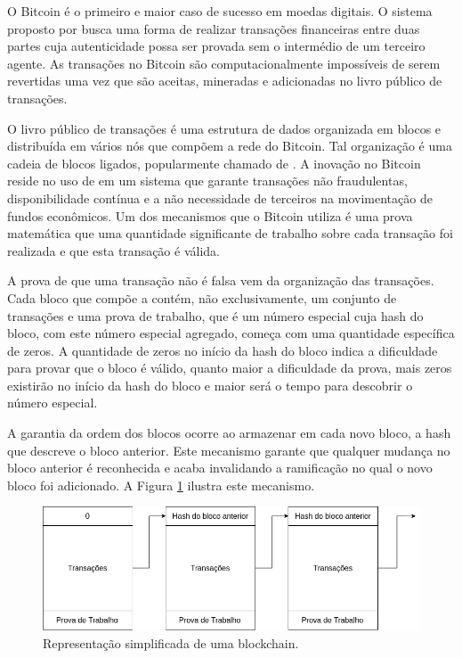 \documentclass[tcc,capa]{texufpel}
\begin{document}
	O Bitcoin é o primeiro e maior caso de sucesso em moedas digitais. O sistema proposto por \cite{nakamoto2008bitcoin} busca uma forma de realizar transações financeiras entre duas partes cuja autenticidade possa ser provada sem o intermédio de um terceiro agente. As transações no Bitcoin são computacionalmente impossíveis de serem revertidas uma vez que são aceitas, mineradas e adicionadas no livro público de transações.
	
	O livro público de transações é uma estrutura de dados organizada em blocos e distribuída em vários nós que compõem a rede do Bitcoin. Tal organização é uma cadeia de blocos ligados, popularmente chamado de \bchain. A inovação no Bitcoin reside no uso de \bchain em um sistema que garante transações não fraudulentas, disponibilidade contínua e a não necessidade de terceiros na movimentação de fundos econômicos. Um dos mecanismos que o Bitcoin utiliza é uma prova matemática que uma quantidade significante de trabalho sobre cada transação foi realizada e que esta transação é válida. 
	
	A prova de que uma transação não é falsa vem da organização das transações. Cada bloco que compõe a \bchain contém, não exclusivamente, um conjunto de transações e uma prova de trabalho, que é um número especial cuja hash do bloco, com este número especial agregado, começa com uma quantidade específica de zeros. A quantidade de zeros no início da hash do bloco indica a dificuldade para provar que o bloco é válido, quanto maior a dificuldade da prova, mais zeros existirão no início da hash do bloco e maior será o tempo para descobrir o número especial.
	
	A garantia da ordem dos blocos ocorre ao armazenar em cada novo bloco, a hash que descreve o bloco anterior. Este mecanismo garante que qualquer mudança no bloco anterior é reconhecida e acaba invalidando a ramificação no qual o novo bloco foi adicionado. A Figura \ref{fig:blockchain-basica} ilustra este mecanismo.
	
	\begin{figure}[h!]
        \centering
        \includegraphics[width=15cm]{imagens/blockchain-basico.png}
        \caption{Representação simplificada de uma blockchain.}
        \label{fig:blockchain-basica}
    \end{figure}
    
\end{document}
